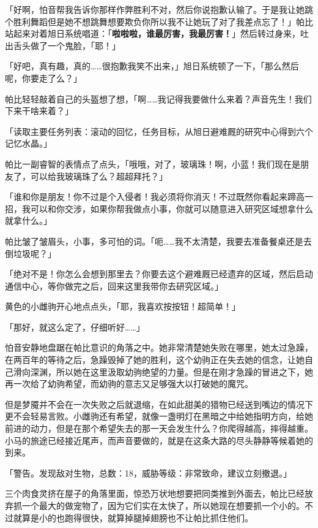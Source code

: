 「好啊，怕音帮我告诉你那样作弊胜利不对，然后你说抱歉认输了。于是我让她跳个胜利舞蹈但是她不想跳舞想要欺负你所以我不让她玩了对了我差点忘了！」帕比站起来对着旭日系统唱道：「\textbf{啦啦啦，谁最厉害，我最厉害！}」然后转过身来，吐出舌头做了一个鬼脸，「耶！」

「好吧，真有趣，真的……很抱歉我笑不出来，」旭日系统顿了一下，「那么然后呢，你要走了么？」

帕比轻轻敲着自己的头盔想了想，「啊……我记得我要做什么来着？声音先生！我们下来干啥来着？」

「{\mt 读取主要任务列表：滚动的回忆，任务目标，从旭日避难厩的研究中心得到六个记忆水晶。}」

帕比一副睿智的表情点了点头，「哦哦，对了，玻璃珠！啊，小蓝！我们现在是朋友了，可以给我玻璃珠了么？超超拜托？」

「谁和你是朋友！你不过是个入侵者！我必须将你消灭！不过既然你看起来蹄高一招，我可以和你交涉，如果你帮我做点小事，你就可以随意进入研究区域想拿什么就拿什么。」

帕比皱了皱眉头，小事，多可怕的词。「呃……我不太清楚，我要去准备餐桌还是去倒垃圾呢？」

「绝对不是！你怎么会想到那里去？你要去这个避难厩已经遗弃的区域，然后启动通信中心，等你做完之后，回来这里我带你去研究区域。」

黄色的小雌驹开心地点点头，「耶，我喜欢按按钮！超简单！」

「那好，就这么定了，仔细听好……」

\horizonline

\unknowndaytimeplace

怕音安静地盘踞在帕比意识的角落之中。她非常清楚她失败在哪里，她太过急躁，在两百年的等待之后，急躁毁掉了她的胜利，这个幼驹正在失去她的信念，让她自己滑向深渊，所以她在这里汲取幼驹绝望的力量。但是在刚才急躁的冒进之下，她再一次给了幼驹希望，而幼驹的意志又足够强大以打破她的魔咒。

但是梦魇并不会在一次失败之后就退缩，在如此甜美的猎物已经送到嘴边的情况下更不会轻易言败。小雌驹还有希望，就像一盏明灯在黑暗之中给她指明方向，给她前进的动力，但是在那个希望失去的那一天会发生什么？你爬得越高，摔得越重。小马的旅途已经接近尾声，而声音要做的，就是在这条大路的尽头静静等候着她的到来。

\horizonline


「{\mt 警告。发现敌对生物，总数：18，威胁等级：非常致命，建议立刻撤退。}」

三个肉食灵挤在屋子的角落里面，惊恐万状地想要把同类推到外面去，帕比已经放弃抓一个最大的做宠物了，因为它们实在太快了，所以她现在想要抓一个小的。不过就算是小的也跑得很快，就算掉腿掉翅膀也不让帕比抓住他们。

